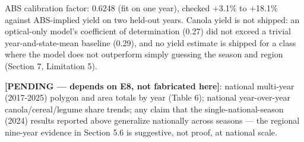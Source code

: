 ABS calibration factor: 0.6248 (fit on one year), checked +3.1\% to +18.1\% against ABS-implied yield on two held-out years. Canola yield is not shipped: an optical-only model's coefficient of determination (0.27) did not exceed a trivial year-and-state-mean baseline (0.29), and no yield estimate is shipped for a class where the model does not outperform simply guessing the season and region (Section 7, Limitation 5).

\textbf{{[}PENDING --- depends on E8, not fabricated here{]}}: national multi-year (2017-2025) polygon and area totals by year (Table 6); national year-over-year canola/cereal/legume share trends; any claim that the single-national-season (2024) results reported above generalize nationally across seasons --- the regional nine-year evidence in Section 5.6 is suggestive, not proof, at national scale.

